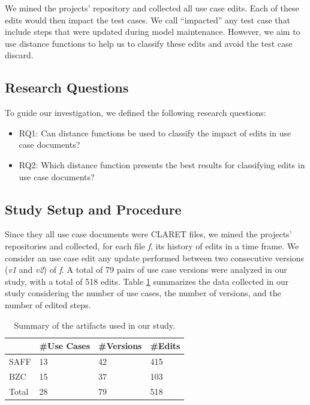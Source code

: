 
We mined the projects' repository and collected all use case edits. Each of these edits would then impact the test cases. We call ``impacted'' any test case that include steps that were updated during model maintenance. However, we aim to use distance functions to help us to classify these edits and avoid the test case discard.

\subsection{Research Questions}
To guide our investigation, we defined the following research questions:
\begin{itemize}
\item RQ1: Can distance functions be used to classify the impact of edits in use case documents?  
\item RQ2: Which distance function presents the best results for classifying edits in use case documents?
\end{itemize}

\subsection{Study Setup and Procedure} \label{sec:procedure}
Since they all use case documents were CLARET files, we mined the projects' repositories and collected, for each file \textit{f}, its history of edits in a time frame. We consider an use case edit any update performed between two consecutive versions (\textit{v1} and \textit{v2}) of \textit{f}. A total of 79 pairs of use case versions were analyzed in our study, with a total of 518 edits. Table \ref{tab:useCases} summarizes the data collected in our study considering the number of use cases, the number of versions, and the number of edited steps.

\begin{table}[]
\centering
\caption{Summary of the artifacts used in our study.}
\label{tab:useCases}
\begin{tabular}{|l|l|l|l|}
\hline
     & \#Use Cases & \#Versions &\#Edits \\ \hline
SAFF &     13      &      42    &     415         \\ \hline
BZC  &      15     &      37    &     103        \\ \hline
Total  &      28     &      79    &     518         \\ \hline
\end{tabular}
\end{table}

